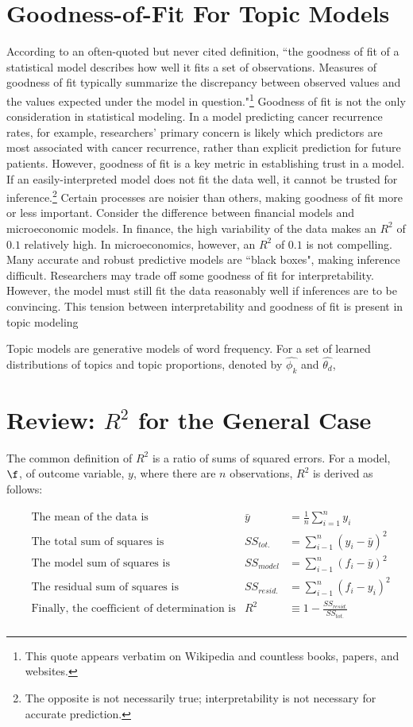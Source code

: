 \documentclass[12pt]{amsart}
\begin{document}
\section{Goodness-of-Fit For Topic Models}

According to an often-quoted but never cited definition, ``the goodness of fit of a statistical model describes how well it fits a set of observations. Measures of goodness of fit typically summarize the discrepancy between observed values and the values expected under the model in question."\footnote{This quote appears verbatim on Wikipedia and countless books, papers, and websites.} Goodness of fit is not the only consideration in statistical modeling. In a model predicting cancer recurrence rates, for example, researchers' primary concern is likely which predictors are most associated with cancer recurrence, rather than explicit prediction for future patients. However, goodness of fit is a key metric in establishing trust in a model. If an easily-interpreted model does not fit the data well, it cannot be trusted for inference.\footnote{The opposite is not necessarily true; interpretability is not necessary for accurate prediction.} Certain processes are noisier than others, making goodness of fit more or less important. Consider the difference between financial models and microeconomic models. In finance, the high variability of the data makes an $R^2$ of $0.1$ relatively high. In microeconomics, however, an $R^2$ of $0.1$ is not compelling. Many accurate and robust predictive models are ``black boxes", making inference difficult. Researchers may trade off some goodness of fit for interpretability. However, the model must still fit the data reasonably well if inferences are to be convincing. This tension between interpretability and goodness of fit is present in topic modeling


Topic models are generative models of word frequency. For a set of learned distributions of topics and topic proportions, denoted by $\hat{\phi_k}$ and $\hat{\theta_d}$, 

\section{Review: $R^2$ for the General Case}

The common definition of $R^2$ is a ratio of sums of squared errors. For a model, $\f$, of outcome variable, $y$, where there are $n$ observations, $R^2$ is derived as follows:

\begin{align*}
& \text{The mean of the data is} & \bar{y} &= \frac{1}{n}\sum_{i=1}^n{y_i}\\
& \text{The total sum of squares is} & SS_{tot.} &= \sum_{i-1}^n{(y_i-\bar{y})^2}\\
& \text{The model sum of squares is} & SS_{model} &= \sum_{i-1}^n{(f_i-\bar{y})^2}\\
& \text{The residual sum of squares is} & SS_{resid.} &= \sum_{i-1}^n{(f_i-y_i)^2}\\
& \text{Finally, the coefficient of determination is} & R^2 &\equiv 1 - \frac{SS_{resid.}}{SS_{tot.}}\\
\end{align*}
\end{document}
